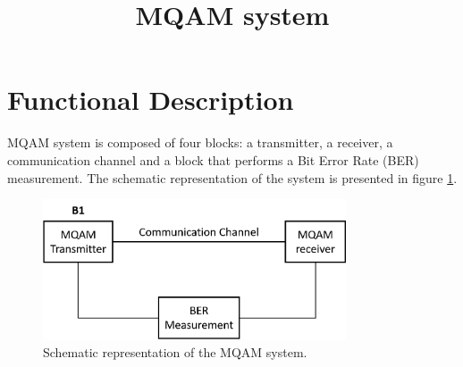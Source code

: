 \documentclass[a4paper]{article}
\title{MQAM system}
\begin{document}
	
	\maketitle
	
\section{Functional Description}
	
MQAM system is composed of four blocks: a transmitter, a receiver, a communication channel and a block that performs a Bit Error Rate (BER) measurement. The schematic representation of the system is presented in figure \ref{MQAM_system_block_diagram}.

\begin{figure}
	\centering
	\includegraphics[width=0.8\textwidth]{MQAM_system_block_diagram}
	\caption{Schematic representation of the MQAM system.}\label{MQAM_system_block_diagram}
\end{figure}

%
%
%
%
%
%

\end{document}
